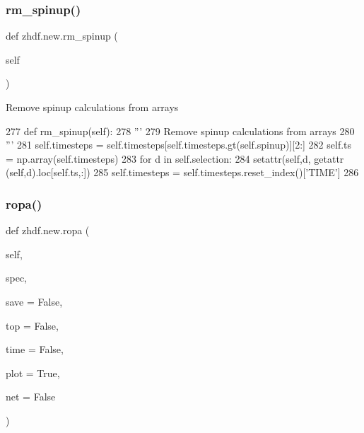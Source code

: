 \subsubsection{\texorpdfstring{rm\+\_\+spinup()}{rm\_spinup()}\hspace{0.1cm}{\footnotesize\ttfamily [2/2]}}
{\footnotesize\ttfamily def zhdf.\+new.\+rm\+\_\+spinup (\begin{DoxyParamCaption}\item[{}]{self }\end{DoxyParamCaption})}

\begin{DoxyVerb}Remove spinup calculations from arrays
\end{DoxyVerb}
 
\begin{DoxyCode}
277     \textcolor{keyword}{def }rm\_spinup(self):
278         \textcolor{stringliteral}{'''}
279 \textcolor{stringliteral}{        Remove spinup calculations from arrays}
280 \textcolor{stringliteral}{        '''}
281         self.timesteps = self.timesteps[self.timesteps.gt(self.spinup)][2:]
282         self.ts = np.array(self.timesteps)
283         \textcolor{keywordflow}{for} d \textcolor{keywordflow}{in} self.selection:
284             setattr(self,d, getattr (self,d).loc[self.ts,:])
285         self.timesteps = self.timesteps.reset\_index()[\textcolor{stringliteral}{'TIME'}]
286 
\end{DoxyCode}
\mbox{\label{classzhdf_1_1new_aad68ddbb6791ca56a8495047091ccd72}} 
\subsubsection{\texorpdfstring{ropa()}{ropa()}\hspace{0.1cm}{\footnotesize\ttfamily [1/2]}}
{\footnotesize\ttfamily def zhdf.\+new.\+ropa (\begin{DoxyParamCaption}\item[{}]{self,  }\item[{}]{spec,  }\item[{}]{save = {\ttfamily False},  }\item[{}]{top = {\ttfamily False},  }\item[{}]{time = {\ttfamily False},  }\item[{}]{plot = {\ttfamily True},  }\item[{}]{net = {\ttfamily False} }\end{DoxyParamCaption})}

